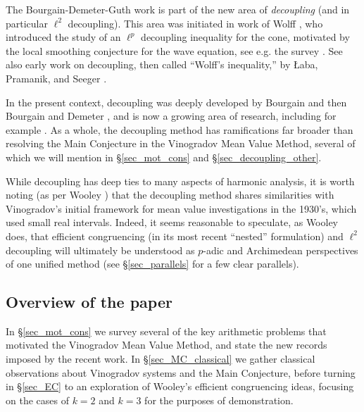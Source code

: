 \documentclass[brochure,english,12pt]{bourbaki}%
\begin{document}
 The Bourgain-Demeter-Guth work \cite{BDG16} is part of the new area of \emph{decoupling} (and in particular $\ell^2$ decoupling). This area was initiated in work of Wolff \cite{Wol00}, who introduced the study of an $\ell^p$ decoupling inequality  for the cone, motivated by the local smoothing conjecture for the wave equation, see e.g. the survey \cite{Sog95}. See also  early work on decoupling, then called ``Wolff's inequality,'' by {\L}aba, Pramanik, and Seeger  \cite{LabWol02,LabPra06,PraSee07}.
 
In the present context, decoupling was deeply developed by Bourgain \cite{Bou13} and then Bourgain and Demeter \cite{BouDem13a,BouDem14x,BouDem14xb,BouDem15a,BouDem15x,BouDem15,BouDem16a,BouDem16b,BouDem17a}, and is now a growing area of research, including for example \cite{BouWat15x,Bou14x,Bou16x,Bou17a,BDG16x,DGS16x,DGL16x,FSWW16,DGG17x,Guo17x}.
As a whole, the decoupling method has ramifications far broader than resolving the Main Conjecture in the Vinogradov Mean Value Method, several of which we will mention in \S \ref{sec_mot_cons} and \S \ref{sec_decoupling_other}.


While decoupling has deep ties to many aspects of harmonic analysis, it is worth noting (as per Wooley \cite{Woo17b}) that the decoupling method shares similarities with Vinogradov's initial framework for mean value investigations in the 1930's, which used small real intervals. Indeed, it seems reasonable to speculate, as Wooley does, that efficient congruencing (in its most recent ``nested'' formulation) and $\ell^2$ decoupling will ultimately be understood as $p$-adic and Archimedean perspectives of one unified method (see \S \ref{sec_parallels} for a few clear parallels).


\subsection{Overview of the paper}

In \S \ref{sec_mot_cons} we survey several of the key arithmetic problems that motivated the Vinogradov Mean Value Method, and state the new records imposed by the recent work. In \S \ref{sec_MC_classical} we gather classical observations about Vinogradov systems and the Main Conjecture, before turning in \S \ref{sec_EC} to an exploration of Wooley's efficient congruencing ideas, focusing on the cases of $k=2$ and $k=3$ for the purposes of demonstration. 
\end{document}
